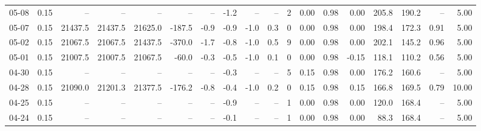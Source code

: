 \begin{threeparttable}
{\begin{tabular}{lrrrrrrrrrrrrrrrrr}
  05-08 &     0.15 &      -- &      -- &      -- &         -- &             -- &                      -1.2 &                       -- &                  -- &              2 &       0.00 &      0.98 &           0.00 &            205.8 &               190.2 &              -- &                   5.00 \\
  05-07 &     0.15 & 21437.5 & 21437.5 & 21625.0 &     -187.5 &           -0.9 &                      -0.9 &                     -1.0 &                 0.3 &              0 &       0.00 &      0.98 &           0.00 &            198.4 &               172.3 &            0.91 &                   5.00 \\
  05-02 &     0.15 & 21067.5 & 21067.5 & 21437.5 &     -370.0 &           -1.7 &                      -0.8 &                     -1.0 &                 0.5 &              9 &       0.00 &      0.98 &           0.00 &            202.1 &               145.2 &            0.96 &                   5.00 \\
  05-01 &     0.15 & 21007.5 & 21007.5 & 21067.5 &      -60.0 &           -0.3 &                      -0.5 &                     -1.0 &                 0.1 &              0 &       0.00 &      0.98 &          -0.15 &            118.1 &               110.2 &            0.56 &                   5.00 \\
  04-30 &     0.15 &      -- &      -- &      -- &         -- &             -- &                      -0.3 &                       -- &                  -- &              5 &       0.15 &      0.98 &           0.00 &            176.2 &               160.6 &              -- &                   5.00 \\
  04-28 &     0.15 & 21090.0 & 21201.3 & 21377.5 &     -176.2 &           -0.8 &                      -0.4 &                     -1.0 &                 0.2 &              0 &       0.15 &      0.98 &           0.15 &            166.8 &               169.5 &            0.79 &                  10.00 \\
  04-25 &     0.15 &      -- &      -- &      -- &         -- &             -- &                      -0.9 &                       -- &                  -- &              1 &       0.00 &      0.98 &           0.00 &            120.0 &               168.4 &              -- &                   5.00 \\
  04-24 &     0.15 &      -- &      -- &      -- &         -- &             -- &                      -0.1 &                       -- &                  -- &              1 &       0.00 &      0.98 &           0.00 &             88.3 &               168.4 &              -- &                   5.00 \\

\end{tabular}}
\end{threeparttable}
